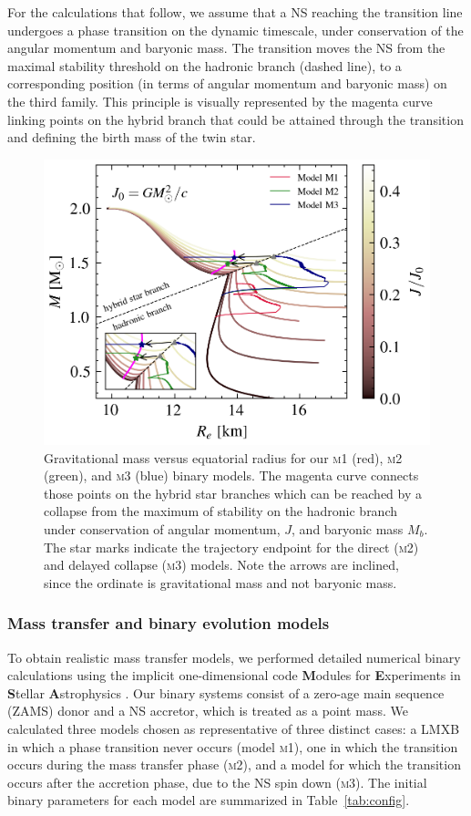 \documentclass[main.tex]{subfiles}
\begin{document}
        For the calculations that follow, we assume that a NS reaching the transition line undergoes a phase transition on the dynamic timescale, under conservation of the angular momentum and baryonic mass. 
        The transition moves the NS from the maximal stability threshold on the hadronic branch (dashed line), to a corresponding position (in terms of angular momentum and baryonic mass) on the third family. This principle is visually represented by the magenta curve linking points on the hybrid branch that could be attained through the transition and defining the birth mass of the twin star. 
        
        
        \begin{figure}
            \centering
            \includegraphics[width=0.5\columnwidth]{figures/chapter3/m_vs_r.png}
            \caption{Gravitational mass versus equatorial radius for our \textsc{m1} (red), \textsc{m2} (green), and \textsc{m3} (blue) binary models. The magenta curve connects those points on the hybrid star branches which can be reached by a collapse from the maximum of stability on the hadronic branch under conservation of angular momentum, $J$, and baryonic mass $M_b$. The star marks indicate the trajectory endpoint for the direct (\textsc{m2}) and delayed collapse (\textsc{m3}) models. Note the arrows are inclined, since the ordinate is gravitational mass and not baryonic mass.}
            \label{fig:mvsr}
        \end{figure}
        
    
    
    \subsubsection{Mass transfer and binary evolution models} \label{sec:input_params}
        To obtain realistic mass transfer models, we performed detailed numerical binary calculations using the implicit one-dimensional code \textbf{M}odules for \textbf{E}xperiments in \textbf{S}tellar \textbf{A}strophysics \citep[\mesa\,v12778;][]{Paxton:2010ji,Paxton:2013pj,Paxton:2015jva,Paxton:2017eie}. Our binary systems consist of a zero-age main sequence (ZAMS) donor and a NS accretor, which is treated as a point mass.
        We calculated three models chosen as representative of three distinct cases: a LMXB in which a phase transition never occurs (model \textsc{m1}), one in which the transition occurs during the mass transfer phase (\textsc{m2}), and a model for which the transition occurs after the accretion phase, due to the NS spin down (\textsc{m3}). The initial binary parameters for each model are summarized in Table~\ref{tab:config}.
        
\end{document}
